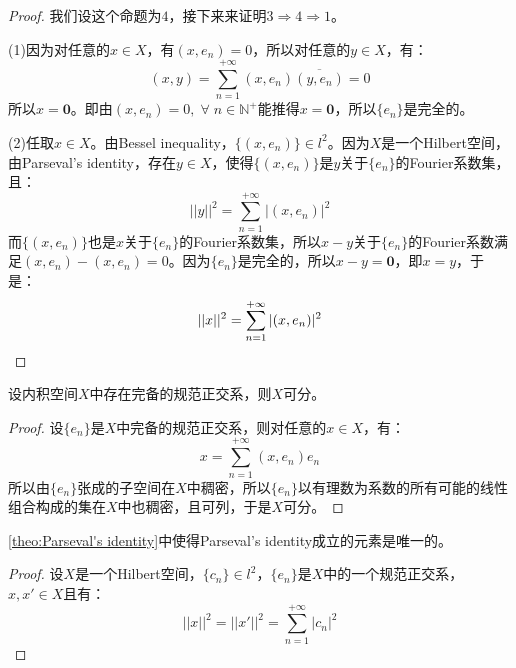 \begin{proof}
	我们设这个命题为$4$，接下来来证明$3\Rightarrow4\Rightarrow1$。\par
	(1)因为对任意的$x\in X$，有$(x,e_n)=0$，所以对任意的$y\in X$，有：
	\begin{equation*}
		(x,y)=\sum_{n=1}^{+\infty}(x,e_n)\overline{(y,e_n)}=0
	\end{equation*}
	所以$x=\mathbf{0}$。即由$(x,e_n)=0,\;\forall\;n\in\mathbb{N}^+$能推得$x=\mathbf{0}$，所以$\{e_n\}$是完全的。\par
	(2)任取$x\in X$。由Bessel inequality，$\{(x,e_n)\}\in l^2$。因为$X$是一个Hilbert空间，由Parseval's identity，存在$y\in X$，使得$\{(x,e_n)\}$是$y$关于$\{e_n\}$的Fourier系数集，且：
	\begin{equation*}
		||y||^2=\sum_{n=1}^{+\infty}|(x,e_n)|^2
	\end{equation*}
	而$\{(x,e_n)\}$也是$x$关于$\{e_n\}$的Fourier系数集，所以$x-y$关于$\{e_n\}$的Fourier系数满足$(x,e_n)-(x,e_n)=0$。因为$\{e_n\}$是完全的，所以$x-y=\mathbf{0}$，即$x=y$，于是：
	\begin{equation*}
		||x||^2=\sum_{n=1}^{+\infty}|(x,e_n)|^2\qedhere
	\end{equation*}
\end{proof}
\begin{corollary}
	设内积空间$X$中存在完备的规范正交系，则$X$可分。
\end{corollary}
\begin{proof}
	设$\{e_n\}$是$X$中完备的规范正交系，则对任意的$x\in X$，有：
	\begin{equation*}
		x=\sum_{n=1}^{+\infty}(x,e_n)e_n
	\end{equation*}
	所以由$\{e_n\}$张成的子空间在$X$中稠密，所以$\{e_n\}$以有理数为系数的所有可能的线性组合构成的集在$X$中也稠密，且可列，于是$X$可分。
\end{proof}
\begin{corollary}\label{corollary:Parseval's identity Uniqueness}
	\cref{theo:Parseval's identity}中使得Parseval's identity成立的元素是唯一的。
\end{corollary}
\begin{proof}
	设$X$是一个Hilbert空间，$\{c_n\}\in l^2$，$\{e_n\}$是$X$中的一个规范正交系，$x,x'\in X$且有：
	\begin{equation*}
		||x||^2=||x'||^2=\sum_{n=1}^{+\infty}|c_n|^2
	\end{equation*}
\end{proof}
